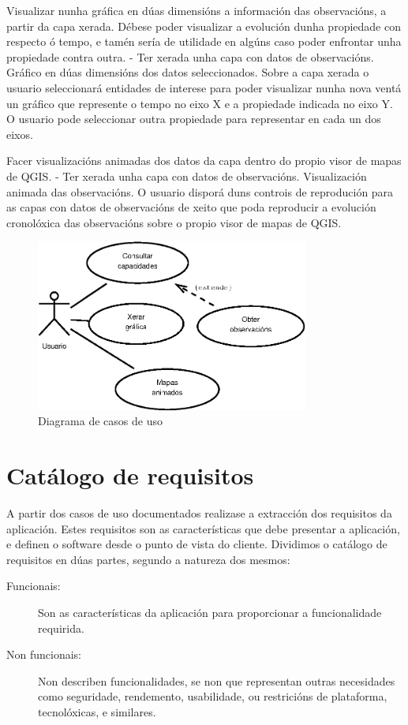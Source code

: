 			{Visualizar nunha gráfica en dúas dimensións a información das observacións, a partir da capa xerada. Débese poder visualizar a evolución dunha propiedade con respecto ó tempo, e tamén sería de utilidade en algúns caso poder enfrontar unha propiedade contra outra. } %
			{-} %
			{Ter xerada unha capa con datos de observacións.} %
			{Gráfico en dúas dimensións dos datos seleccionados.} %
			{Sobre a capa xerada o usuario seleccionará entidades de interese para poder visualizar nunha nova ventá un gráfico que represente o tempo no eixo X e a propiedade indicada no eixo Y. O usuario pode seleccionar outra propiedade para representar en cada un dos eixos.
			} %
			
			{Facer visualizacións animadas dos datos da capa dentro do propio visor de mapas de QGIS.} %
			{-} %
			{Ter xerada unha capa con datos de observacións.} %
			{Visualización animada das observacións.} %
			{O usuario disporá duns controis de reprodución para as capas con datos de observacións de xeito que poda reproducir a evolución cronolóxica das observacións sobre o propio visor de mapas de QGIS. 
			} %

\begin{figure}[hbtp]
\centering
\includegraphics[width=0.8\textwidth]{images/uc.eps}
\caption{Diagrama de casos de uso}
\label{fig:uc} 
\end{figure}

\section{Catálogo de requisitos}
A partir dos casos de uso documentados realizase a extracción dos requisitos da aplicación. Estes requisitos son as características que debe presentar a aplicación, e definen o software desde o punto de vista do cliente. Dividimos o catálogo de requisitos en dúas partes, segundo a natureza dos mesmos:
\begin{description}
\item[Funcionais:] Son as características da aplicación para proporcionar a funcionalidade requirida.
\item[Non funcionais:] Non describen funcionalidades, se non que representan outras necesidades como seguridade, rendemento, usabilidade, ou restricións de plataforma, tecnolóxicas, e similares.
\end{description}

